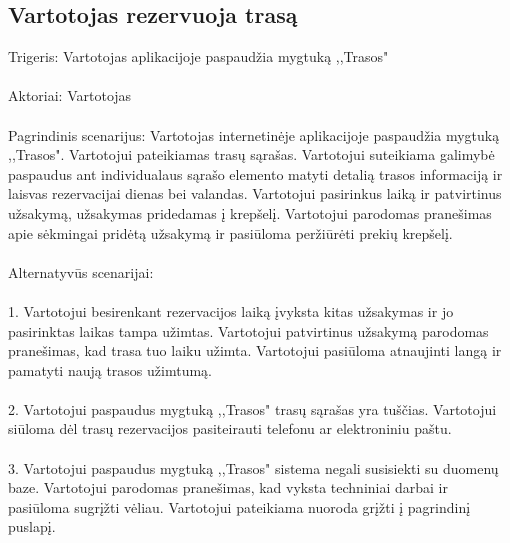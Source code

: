 \documentclass[oneside]{VUMIFPSkursinis}
\begin{document}
\subsection{Vartotojas rezervuoja trasą}
	Trigeris: Vartotojas aplikacijoje paspaudžia mygtuką ,,Trasos"\\ \\
	Aktoriai: Vartotojas\\ \\
	Pagrindinis scenarijus: Vartotojas internetinėje aplikacijoje paspaudžia mygtuką ,,Trasos". Vartotojui pateikiamas trasų sąrašas. Vartotojui suteikiama galimybė paspaudus ant individualaus sąrašo elemento matyti detalią trasos informaciją ir laisvas rezervacijai dienas bei valandas. Vartotojui pasirinkus laiką ir patvirtinus užsakymą, užsakymas pridedamas į krepšelį. Vartotojui parodomas pranešimas apie sėkmingai pridėtą užsakymą ir pasiūloma peržiūrėti prekių krepšelį.\\ \\
	Alternatyvūs scenarijai:\\ \\
1. Vartotojui besirenkant rezervacijos laiką įvyksta kitas užsakymas ir jo pasirinktas laikas tampa užimtas. Vartotojui patvirtinus užsakymą parodomas pranešimas, kad trasa tuo laiku užimta. Vartotojui pasiūloma atnaujinti langą ir pamatyti naują trasos užimtumą.\\ \\
2. Vartotojui paspaudus mygtuką ,,Trasos" trasų sąrašas yra tuščias. Vartotojui siūloma dėl trasų rezervacijos pasiteirauti telefonu ar elektroniniu paštu.\\ \\
3. Vartotojui paspaudus mygtuką ,,Trasos" sistema negali susisiekti su duomenų baze. Vartotojui parodomas pranešimas, kad vyksta techniniai darbai ir pasiūloma sugrįžti vėliau. Vartotojui pateikiama nuoroda grįžti į pagrindinį puslapį.\\ \\
\end{document}
